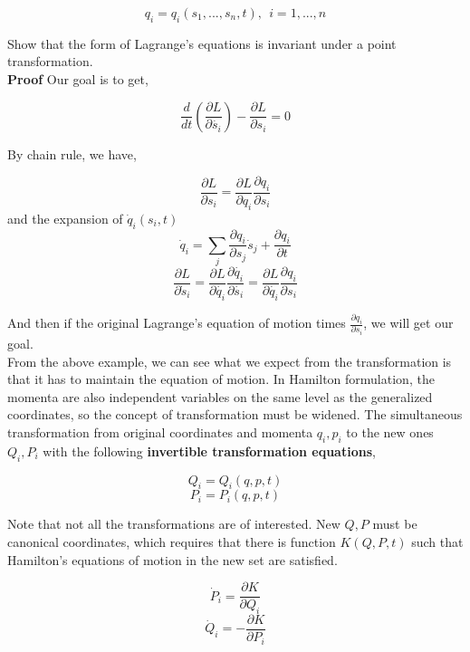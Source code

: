 \documentclass[12pt]{article}
\numberwithin{equation}{section}
\begin{document}
\begin{center}
    \[ q_i = q_i(s_1, ... ,s_n, t),\ \  i = 1, ... ,n \]
\end{center}

Show that the form of Lagrange's equations is invariant under a point transformation.
\\
\indent \textbf{Proof } Our goal is to get,

\begin{center}
    \[ \frac{d}{dt} \left( \frac{\partial L}{\partial \dot{s_i}} \right) - \frac{\partial L}{\partial s_i} = 0 \]
\end{center}

By chain rule, we have,

\begin{center}
    \[ \frac{\partial L}{\partial s_i} = \frac{\partial L}{\partial q_i}\frac{\partial q_i}{\partial s_i} \]
    and the expansion of $\dot{q}_i(s_i, t)$
    \[ \dot{q}_i = \sum_{j}{\frac{\partial q_i}{\partial s_j} \dot{s}_j} + \frac{\partial q_i}{\partial t} \]
    \[ \frac{\partial L}{\partial \dot{s}_i} = \frac{\partial L}{\partial \dot{q_i}} \frac{\partial \dot{q_i}}{\partial \dot{s_i}} = \frac{\partial L}{\partial \dot{q_i}} \frac{\partial q_i}{\partial s_i} \]
\end{center}

And then if the original Lagrange's equation of motion times $\frac{\partial q_i}{\partial s_i}$, we will get our goal.
\\
From the above example, we can see what we expect from the transformation is that it has to maintain the equation of motion. In Hamilton formulation, the momenta are also independent variables on the same level as the generalized coordinates, so the concept of transformation must be widened. The simultaneous transformation from original coordinates and momenta $q_i, p_i$ to the new ones $Q_i, P_i$ with the following \textbf{invertible transformation equations},

\begin{center}
    \[ Q_i = Q_i(q, p, t) \]
    \[ P_i = P_i(q, p, t) \]
\end{center}

Note that not all the transformations are of interested. New $Q, P$ must be canonical coordinates, which requires that there is function $K(Q, P, t)$ such that Hamilton's equations of motion in the new set are satisfied.

\begin{center}
    \[ \dot{P}_i = \frac{\partial K}{\partial Q_i} \]
    \[ \dot{Q}_i = - \frac{\partial K}{\partial P_i} \]
\end{center}
\end{document}
